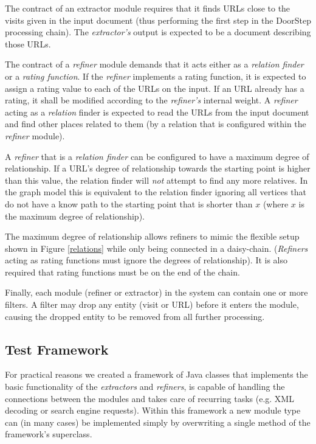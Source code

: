 \documentclass[a4paper]{danarticle}
\theoremstyle{remark}
\begin{document}
      The contract of 
      an extractor module requires that it finds URLs close to the visits given 
      in the input document (thus performing the first step in the DoorStep 
      processing chain). The \textit{extractor's} output is expected to be a 
      document describing those URLs. 
      
      The contract of a \textit{refiner} module 
      demands that it acts either as a \textit{relation finder} or a 
      \textit{rating function}. If the \textit{refiner} implements a rating 
      function, it is expected to assign a rating value to each of the URLs on 
      the input. If an URL already has a rating, it shall be modified according 
      to the \textit{refiner's} internal weight. A \textit{refiner} acting as a 
      \textit{relation} finder is expected to read the URLs from the input 
      document and find other places related to them (by a relation that is 
      configured within the \textit{refiner} module).
      
      A \textit{refiner} that is a \textit{relation finder} can be configured 
      to have a maximum degree of relationship. If a URL's degree of
      relationship towards the starting point is higher than this
      value, the relation finder will \emph{not} attempt to find
      any more relatives. In the graph model this is equivalent to the relation
      finder ignoring all vertices that do not have a know path to the starting
      point that is shorter than $ x $  (where $ x $ is the maximum degree of
      relationship).
      
      The maximum degree of relationship allows refiners to mimic the flexible 
      setup shown in 
      Figure \ref{relations} while only being
      connected in a daisy-chain. (\textit{Refiners} acting as rating 
      functions must ignore the degrees of relationship). It is also required 
      that rating functions must be on the end of the chain.
      
      Finally, each module (refiner or extractor) in the system can contain one
      or more 
      filters. A filter may drop any entity (visit or URL) before it enters the
      module, causing the dropped entity to be removed from all further
      processing.
    \subsection{Test Framework}
      For practical reasons we created a framework of Java classes that 
      implements the basic functionality of the \textit{extractors} and 
      \textit{refiners}, is capable of handling the connections between the 
      modules and takes care of recurring tasks (e.g. XML decoding or search 
      engine requests). Within this framework a new module type can (in many 
      cases) be implemented simply by overwriting a single method of the 
      framework's superclass.
      
\end{document}
